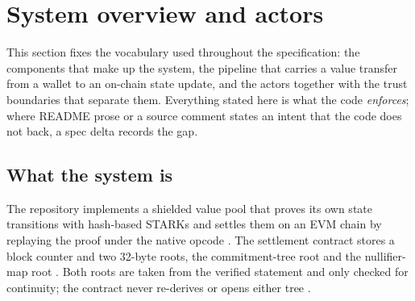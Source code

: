 \section{System overview and actors}
\label{sec:overview}

This section fixes the vocabulary used throughout the specification: the
components that make up the system, the pipeline that carries a value transfer
from a wallet to an on-chain state update, and the actors together with the
trust boundaries that separate them. Everything stated here is what the code
\emph{enforces}; where README prose or a source comment states an intent that
the code does not back, a spec delta records the gap.

\subsection{What the system is}

The repository implements a shielded value pool that proves its own state
transitions with hash-based STARKs and settles them on an EVM chain by
replaying the proof under the native  opcode
. The settlement contract stores a block counter and two
32-byte roots, the commitment-tree root  and the
nullifier-map root 
. Both roots are taken from the
verified statement and only checked for continuity; the contract never
re-derives or opens either tree .

